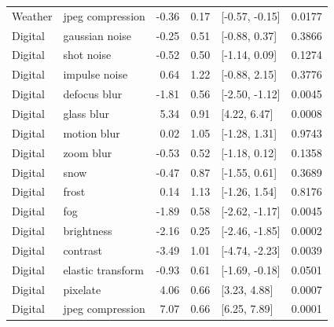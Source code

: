 \begin{longtable}{llrrlr}
Weather & jpeg compression & -0.36 & 0.17 & [-0.57, -0.15] & 0.0177\\
Digital & gaussian noise & -0.25 & 0.51 & [-0.88, 0.37] & 0.3866\\
Digital & shot noise & -0.52 & 0.50 & [-1.14, 0.09] & 0.1274\\
Digital & impulse noise & 0.64 & 1.22 & [-0.88, 2.15] & 0.3776\\
Digital & defocus blur & -1.81 & 0.56 & [-2.50, -1.12] & 0.0045\\
Digital & glass blur & 5.34 & 0.91 & [4.22, 6.47] & 0.0008\\
Digital & motion blur & 0.02 & 1.05 & [-1.28, 1.31] & 0.9743\\
Digital & zoom blur & -0.53 & 0.52 & [-1.18, 0.12] & 0.1358\\
Digital & snow & -0.47 & 0.87 & [-1.55, 0.61] & 0.3689\\
Digital & frost & 0.14 & 1.13 & [-1.26, 1.54] & 0.8176\\
Digital & fog & -1.89 & 0.58 & [-2.62, -1.17] & 0.0045\\
Digital & brightness & -2.16 & 0.25 & [-2.46, -1.85] & 0.0002\\
Digital & contrast & -3.49 & 1.01 & [-4.74, -2.23] & 0.0039\\
Digital & elastic transform & -0.93 & 0.61 & [-1.69, -0.18] & 0.0501\\
Digital & pixelate & 4.06 & 0.66 & [3.23, 4.88] & 0.0007\\
Digital & jpeg compression & 7.07 & 0.66 & [6.25, 7.89] & 0.0001\\
\end{longtable}\endgroup
